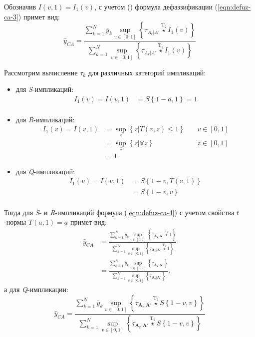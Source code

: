 Обозначив $I(v, 1) = I_1(v)$, с учетом () формула дефаззификации (\ref{eqn:defuz-ca-3}) примет вид:
\begin{equation}
	\label{eqn:defuz-ca-4}
	\hat{y}_{CA} = \frac{\sum_{k=1}^{N} \bar{y}_k \sup_{v\in [0, 1]} \left\{\tau_{A_r|A'}\overset{\mathrm{T}_2}{\star} I_1(v) \right\}}{\sum_{k=1}^{N} \sup_{v\in [0, 1]} \left\{\tau_{A_r|A'}\overset{\mathrm{T}_2}{\star} I_1(v) \right\}}
\end{equation}

Рассмотрим вычисление $\tau_k$ для различных категорий импликаций:
\begin{itemize}
	\item для \textit{S}-импликаций:
	\begin{align*}
		I_1(v) = I(v, 1) &= S\left\{1-a, 1\right\} = 1\\
	\end{align*}
	\item для \textit{R}-импликаций:
	\begin{align*}
		I_1(v) = I(v, 1) &= \sup_z \left\{z | T(v, z) \le 1\right\}&\quad v\in [0, 1]\\
		&= \sup_z \left\{z | \forall z\right\}&\quad z\in [0, 1]\\
		&= 1
	\end{align*}
	\item для \textit{Q}-импликаций:
	\begin{align*}
		I_1(v) = I(v, 1) &= S\left\{1-v, T(v, 1)\right\}\\
		&= S\left\{1-v, v\right\}\\
	\end{align*}
\end{itemize}


Тогда для \textit{S}- и \textit{R}-импликаций формула (\ref{eqn:defuz-ca-4}) с учетом свойства $t$-нормы $T(a, 1) = a$ примет вид:
\begin{align}
\hat{y}_{CA} &= \frac{\sum_{k=1}^{N} \bar{y}_k \sup_{v\in [0, 1]} \left\{\tau_{\mathbf{A_r}|\mathbf{A'}}\overset{\mathrm{T}_2}{\star} 1 \right\}}{\sum_{k=1}^{N} \sup_{v\in [0, 1]} \left\{\tau_{\mathbf{A_r}|\mathbf{A'}}\overset{\mathrm{T}_2}{\star} 1 \right\}}\\ &= \frac{\sum_{k=1}^{N} \bar{y}_k \sup_{v\in [0, 1]} \left\{\tau_{\mathbf{A_r}|\mathbf{A'}}\right\}}{\sum_{k=1}^{N} \sup_{v\in [0, 1]} \left\{\tau_{\mathbf{A_r}|\mathbf{A'}}\right\}},
\end{align}
а для \textit{Q}-импликации:
\begin{equation}
	\hat{y}_{CA} = \frac{\sum_{k=1}^{N} \bar{y}_k \sup_{v\in [0, 1]} \left\{\tau_{\mathbf{A_r}|\mathbf{A'}}\overset{\mathrm{T}_2}{\star} S\left\{1-v, v\right\} \right\}}{\sum_{k=1}^{N} \sup_{v\in [0, 1]} \left\{\tau_{\mathbf{A_r}|\mathbf{A'}}\overset{\mathrm{T}_2}{\star} S\left\{1-v, v\right\} \right\}}
\end{equation}

